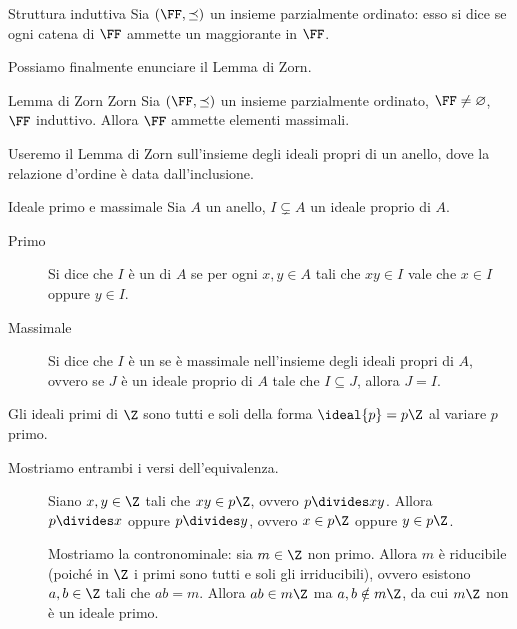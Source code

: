 \begin{definition}
    {Struttura induttiva}{}
    Sia $(\FF, \preceq)$ un insieme parzialmente ordinato: esso si dice  se ogni catena di $\FF$ ammette un maggiorante in $\FF$.
\end{definition}

Possiamo finalmente enunciare il Lemma di Zorn.
\begin{lemma}{Lemma di Zorn} 
    {Zorn}
    Sia $(\FF, \preceq)$ un insieme parzialmente ordinato, $\FF \neq \varnothing$, $\FF$ induttivo. Allora $\FF$ ammette elementi massimali.
\end{lemma}

Useremo il Lemma di Zorn sull'insieme degli ideali propri di un anello, dove la relazione d'ordine è data dall'inclusione.

\begin{definition}
    {Ideale primo e massimale}{}
    Sia $A$ un anello, $I \subsetneq A$ un ideale proprio di $A$. \begin{description}
        \item[Primo] Si dice che $I$ è un  di $A$ se per ogni $x, y \in A$ tali che $xy \in I$ vale che $x \in I$ oppure $y \in I$.
        \item[Massimale] Si dice che $I$ è un  se è massimale nell'insieme degli ideali propri di $A$, ovvero se $J$ è un ideale proprio di $A$ tale che $I \subseteq J$, allora $J = I$.
    \end{description}
\end{definition}

\begin{exercise}
    Gli ideali primi di $\Z$ sono tutti e soli della forma $\ideal{p} = p\Z$ al variare $p$ primo.
\end{exercise}
\begin{solution}
    Mostriamo entrambi i versi dell'equivalenza.
    \begin{description}
        \item[\boximpl ] Siano $x, y \in \Z$ tali che $xy \in p\Z$, ovvero $p \divides xy$. Allora $p \divides x$ oppure $p \divides y$, ovvero $x \in p\Z$ oppure $y \in p\Z$.
        \item[\boximplby] Mostriamo la contronominale: sia $m \in \Z$ non primo. Allora $m$ è riducibile (poiché in $\Z$ i primi sono tutti e soli gli irriducibili), ovvero esistono $a, b \in \Z$ tali che $ab = m$. Allora $ab \in m\Z$ ma $a, b \notin m\Z$, da cui $m\Z$ non è un ideale primo. \qedhere
    \end{description}
\end{solution}

